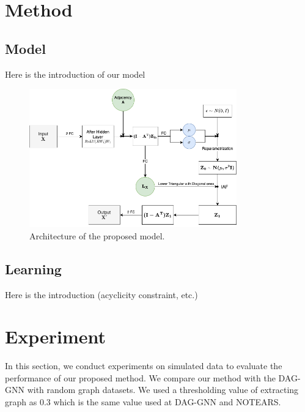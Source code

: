 \documentclass[10pt]{article}
\begin{document}
\section{Method}

\subsection{Model}

Here is the introduction of our model

\begin{figure}
    \centering
    \includegraphics[width=0.8\textwidth]{fig/model.png}
    \caption{Architecture of the proposed model.}
    \label{diagram}
\end{figure}

\subsection{Learning}

Here is the introduction (acyclicity constraint, etc.)

\section{Experiment}

In this section, we conduct experiments on simulated data to evaluate the performance of our proposed method. We compare our method with the DAG-GNN \cite{yu2019daggnn} with random graph datasets. We used a thresholding value of extracting graph as 0.3 which is the same value used at DAG-GNN and NOTEARS.\\ 
\end{document}
